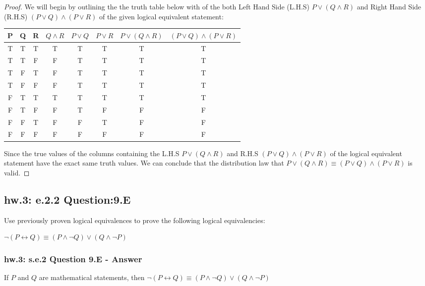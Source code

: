 \begin{proof}
We will begin by outlining the the truth table below with of the both Left Hand Side (L.H.S) $P \vee (Q \wedge R)$ and Right Hand Side (R.H.S) $(P \vee Q) \wedge (P \vee R)$ of the given logical equivalent statement: \\

\begin{center}
\begin{tabular}{|c|c|c|c|c|c|c|c|}
\hline 
P & Q & R & $Q \wedge R$ & $P \vee Q$ & $P \vee R$ & $P \vee (Q \wedge R)$ & $(P \vee Q) \wedge (P \vee R)$ \\ 
\hline 
T & T & T & T & T & T & T & T \\ 
\hline 
T & T & F & F & T & T & T & T \\ 
\hline 
T & F & T & F & T & T & T & T \\ 
\hline 
T & F & F & F & T & T & T & T \\ 
\hline 
F & T & T & T & T & T & T & T \\ 
\hline 
F & T & F & F & T & F & F & F \\ 
\hline 
F & F & T & F & F & T & F & F \\ 
\hline 
F & F & F & F & F & F & F & F \\ 
\hline 
\end{tabular} 
\end{center}
 
Since the true values of the columns containing the L.H.S $P \vee (Q \wedge R)$ and R.H.S $(P \vee Q) \wedge (P \vee R)$ of the logical equivalent statement have the exact same truth values. We can conclude that the distribution law that $P \vee (Q \wedge R) \equiv (P \vee Q) \wedge (P \vee R)$ is valid. 
\end{proof}


\subsection{hw.3: e.2.2 Question:9.E}
Use previously proven logical equivalences to prove the following logical equivalencies: 

\begin{center}
$\neg (P \longleftrightarrow Q) \equiv (P \wedge \neg Q) \vee (Q \wedge \neg P)$
\end{center}

\subsubsection*{hw.3: s.e.2 Question 9.E - Answer}
\begin{tcolorbox}
\begin{theorem}
If $P$ and $Q$ are mathematical statements, then $\neg (P \longleftrightarrow Q) \equiv (P \wedge \neg Q) \vee (Q \wedge \neg P)$
\end{theorem}
\end{tcolorbox}

